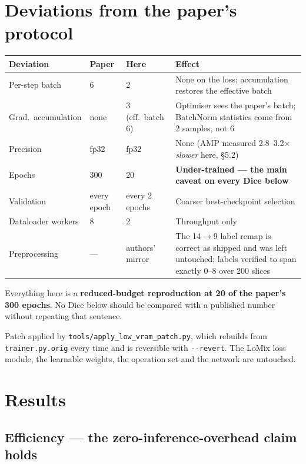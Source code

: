 \documentclass[11pt,a4paper]{article}
\newcommand{\code}[1]{\texttt{\small #1}}
\begin{document}
\section{Deviations from the paper's protocol}

\begin{center}
\begin{tabular}{@{}p{2.9cm}p{1.4cm}p{2.9cm}p{6.3cm}@{}}
\toprule
\textbf{Deviation} & \textbf{Paper} & \textbf{Here} & \textbf{Effect} \\
\midrule
Per-step batch & 6 & 2 & None on the loss; accumulation restores the effective batch \\
Grad.\ accumulation & none & 3 (eff.\ batch 6) & Optimiser sees the paper's batch; BatchNorm statistics come from 2 samples, not 6 \\
Precision & fp32 & fp32 & None (AMP measured 2.8--3.2$\times$ \emph{slower} here, \S5.2) \\
Epochs & 300 & 20 & \textbf{Under-trained --- the main caveat on every Dice below} \\
Validation & every epoch & every 2 epochs & Coarser best-checkpoint selection \\
Dataloader workers & 8 & 2 & Throughput only \\
Preprocessing & --- & authors' mirror & The 14$\rightarrow$9 label remap is correct as shipped and was left untouched; labels verified to span exactly 0--8 over 200 slices \\
\bottomrule
\end{tabular}
\end{center}

Everything here is a \textbf{reduced-budget reproduction at 20 of the paper's
300 epochs}. No Dice below should be compared with a published number without
repeating that sentence.

Patch applied by \code{tools/apply\_low\_vram\_patch.py}, which rebuilds from
\code{trainer.py.orig} every time and is reversible with \code{-{}-revert}. The
LoMix loss module, the learnable weights, the operation set and the network are
untouched.

\section{Results}

\subsection{Efficiency --- the zero-inference-overhead claim holds}
\end{document}
